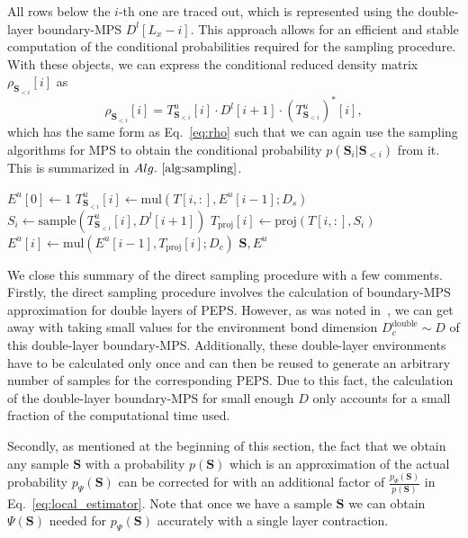 \documentclass[aps,notitlepage,twocolumn,nofootinbib,superscriptaddress,pra,10pt]{revtex4-2}
\begin{document}
All rows below the $i$-th one are traced out, which is represented using the double-layer boundary-MPS $D^l[L_x-i]$. This approach allows for an efficient and stable computation of the conditional probabilities required for the sampling procedure.
With these objects, we can express the conditional reduced density matrix $\rho_{\textbf{S}_{<i}}[i]$ as
\begin{equation}
    \rho_{\textbf{S}_{<i}}[i] = T^u_{\textbf{S}_{<i}}[i] \cdot D^l[i+1]\cdot (T^u_{\textbf{S}_{<i}})^*[i],
\end{equation}
which has the same form as Eq.~\eqref{eq:rho} such that we can again use the sampling algorithms for MPS to obtain the conditional probability  $p(\textbf{S}_i | \textbf{S}_{<i})$ from it. This is summarized in $Alg.~\ref{alg:sampling}$.


\begin{algorithm}[H]
\caption{Sampling algorithm}
\label{alg:sampling}
\begin{algorithmic}
    \State $E^u[0] \gets 1$
        \State $T^u_{\textbf{S}_{<i}}[i] \gets \text{mul}(T[i,:],  E^u[i-1]; D_s)$
        \State $S_i \gets \text{sample}(T^u_{\textbf{S}_{<i}}[i], D^l[i+1])$
        \State $T_\text{proj}[i] \gets \text{proj}(T[i,:], S_i)$
        \State $E^u[i] \gets \text{mul}(E^u[i-1], T_\text{proj}[i]; D_c)$
    \EndFor
    \State \Return $\mathbf{S}, E^u$
\EndFunction
\end{algorithmic}
\end{algorithm}

We close this summary of the direct sampling procedure with a few comments. Firstly, the direct sampling procedure involves the calculation of boundary-MPS approximation for double layers of PEPS.
However, as was noted in~\cite{Vieijra21_directsampling_PEPS}, we can get away with taking small values for the environment bond dimension $D_c^{\text{double}} \sim D$ of this double-layer boundary-MPS.
Additionally, these double-layer environments have to be calculated only once and can then be reused to generate an arbitrary number of samples for the corresponding PEPS.
Due to this fact, the calculation of the double-layer boundary-MPS for small enough $D$ only accounts for a small fraction of the computational time used.

Secondly, as mentioned at the beginning of this section, the fact that we obtain any sample $\textbf{S}$ with a probability $p(\textbf{S})$ which is an approximation of the actual probability $p_\Psi(\textbf{S})$ can be corrected for with an additional factor of $\frac{p_\Psi(\textbf{S})}{p(\textbf{S})}$ in Eq.~\eqref{eq:local_estimator}. Note that once we have a sample $\textbf{S}$ we can obtain $\Psi(\textbf{S})$ needed for $p_\Psi(\textbf{S})$ accurately with a single layer contraction.
\end{document}
